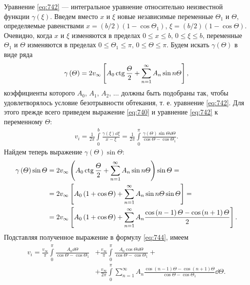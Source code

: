 	Уравнение \eqref{eq:742} --- интегральное уравнение относительно неизвестной функции $\gamma\left(\xi\right)$. Введем вместо $x$ и $\xi$ новые независимые переменные $\varTheta_1$ и $\varTheta$, определяемые равенствами $x = \left(b/2\right)\left(1 - \cos\varTheta_1\right)$, $\xi = \left(b/2\right)\left(1 - \cos\varTheta\right)$. Очевидно, когда $x$ и $\xi$ изменяются в пределах $0 \leqslant x \leqslant b$, $0 \leqslant \xi \leqslant b$, переменные $\varTheta_1$ и $\varTheta$ изменяются в пределах $0 \leqslant \varTheta_1 \leqslant \pi$, $0 \leqslant \varTheta \leqslant \pi$.\n
	Будем искать $\gamma\left(\varTheta\right)$ в виде ряда
	\begin{gather}\label{eq:743}
		\gamma\left(\varTheta\right) = 2v_\infty\left[A_0\operatorname{ctg}\frac{\varTheta}{2} + \sum_{n = 1}^{\infty}A_n\sin n\varTheta\right],
	\end{gather}
	коэффициенты которого $A_0$, $A_1$, $A_2$, $\dots$ должны быть подобраны так, чтобы удовлетворялось условие безотрывности обтекания, т. е. уравнение \eqref{eq:742}. Для этого прежде всего приведем выражение \eqref{eq:740} и уравнение \eqref{eq:742} к переменному $\varTheta$:
	\begin{gather}\label{eq:744}
		v_i = \frac{1}{2\pi}\int\limits_0^b\frac{\gamma\left(\xi\right)\dd\xi}{x - \xi} = \frac{1}{2\pi}\int\limits_0^\pi\frac{\gamma\left(\varTheta\right)\sin\varTheta\dd\varTheta}{\cos\varTheta - \cos\varTheta_1}.
	\end{gather}\n
	Найдем теперь выражение $\gamma\left(\varTheta\right)\sin\varTheta$:
	\begin{gather*}
		\begin{aligned}
			\gamma\left(\varTheta\right)\sin\varTheta &= 2v_\infty\left(A_0\operatorname{ctg}\frac{\varTheta}{2} + \sum_{n = 1}^{\infty}A_n\sin n\varTheta\right)\sin\varTheta =\\
			&= 2v_\infty\left[A_0\left(1 + \cos\varTheta\right) + \sum_{n=1}^{\infty}A_n\sin n\varTheta\sin\varTheta\right] =\\
			&=2v_\infty\left[A_0\left(1 + \cos\varTheta\right) + \sum_{n=1}^{\infty}A_n\frac{\cos\left(n-1\right)\varTheta-\cos\left(n+1\right)\varTheta}{2}\right].
		\end{aligned}
	\end{gather*}\n
	Подставляя полученное выражение в формулу \eqref{eq:744}, имеем
	\begin{gather}\label{eq:745}
		\begin{aligned}
			v_i = \frac{v_\infty}{\pi}\int\limits_0^\pi\frac{A_0\dd\varTheta}{\cos\varTheta-\cos\varTheta_1} &+ \frac{v_\infty}{\pi}\int\limits_0^\pi\frac{A_0\cos\varTheta\dd\varTheta}{\cos\varTheta-\cos\varTheta_1} +\\
			&+ \frac{v_\infty}{2\pi}\int\limits_0^\pi\sum_{n=1}^{\infty}A_n\frac{\cos\left(n-1\right)\varTheta-\cos\left(n+1\right)\varTheta}{\cos\varTheta-\cos\varTheta_1}\dd\varTheta.
		\end{aligned}
	\end{gather}\n
